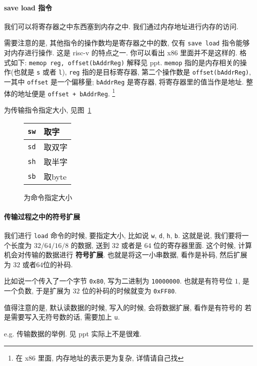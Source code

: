 \documentclass[12pt]{ctexart}
\theoremstyle{definition}
\theoremstyle{definition}
\theoremstyle{plain}
\begin{document}
\paragraph{save load 指令}
我们可以将寄存器之中东西塞到内存之中. 我们通过内存地址进行内存的访问. 

需要注意的是, 其他指令的操作数均是寄存器之中的数, 仅有 \texttt{save load} 指令能够对内存进行操作. 
这是 risc-v 的特点之一. 你可以看出 x86 里面并不是这样的. 格式如下: 
\texttt{memop reg, offset(bAddrReg)}
解释见 ppt. \texttt{memop} 指的是内存相关的操作(也就是 \texttt{s} 或者 \texttt{l}), \texttt{reg} 指的是目标寄存器, 第二个操作数是 
\texttt{offset(bAddrReg)}, 一其中 \texttt{offset} 是一个偏移量; \texttt{bAddrReg} 是寄存器, 将寄存器里的值当作是地址. 整体的地址便是 \texttt{offset + bAddrReg}. \footnote{在 x86 里面, 内存地址的表示更为复杂, 详情请自己找}

为传输指令指定大小, 见图~\ref{tab:daxiao}
\begin{figure}
		\centering
		\begin{tabular}{|c|l|}
		\hline 
		\texttt{sw} &  取字   \\ \hline 
		\texttt{sd} &  取双字 \\ \hline 
		\texttt{sh} &  取半字 \\ \hline 
		\texttt{sb} &  取byte \\ \hline 
		\end{tabular}
		\caption{为命令指定大小}\label{tab:daxiao}
\end{figure}

\paragraph{传输过程之中的符号扩展}
我们进行 \texttt{load} 命令的时候, 要指定大小, 比如说 \texttt{w}, \texttt{d}, \texttt{h}, \texttt{b}.
这就是说, 我们要将一个长度为 \(32/64/16/8\) 的数据, 送到 \(32\) 或者是 \(64\) 位的寄存器里面. 这个时候, 
计算机会对传输的数据进行 \textbf{符号扩展}. 也就是将这一小串数据, 看作是补码, 然后扩展为 \(32\) 或者\(64\)位的补码. 

比如说一个传入了一个字节 \texttt{0x80}, 写为二进制为 \texttt{10000000}. 也就是有符号位 \(1\), 是一个负数, 于是扩展为 \(32\) 位的补码的时候就变为 \texttt{0xFF80}.

值得注意的是, 默认读数据的时候, 写入的时候, 会将数据扩展, 看作是有符号的
若是需要写入无符号数的话, 需要加上 \texttt{u}. 

e.g. 传输数据的举例. 见 ppt 实际上不是很难. 
\end{document}

